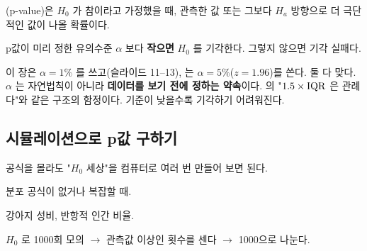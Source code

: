 \begin{definition}[p값]
\label{def:pvalue}
(p-value)은 $H_0$ 가 참이라고 가정했을 때, 관측한 값 또는 그보다
$H_a$ 방향으로 더 극단적인 값이 나올 확률이다.
\end{definition}

p값이 미리 정한 유의수준 $\alpha$ 보다 \textbf{작으면} $H_0$ 를 기각한다.
그렇지 않으면 기각 실패다.

\begin{pitfall}
\label{pit:ht-alpha}
이 장은 $\alpha = 1\%$ 를 쓰고(슬라이드 11--13), 는
$\alpha = 5\%$($z = 1.96$)를 쓴다. 둘 다 맞다. $\alpha$ 는 자연법칙이 아니라
\textbf{데이터를 보기 전에 정하는 약속}이다. 의
"$1.5 \times \mathrm{IQR}$ 은 관례다"와 같은 구조의 함정이다. 기준이 낮을수록
기각하기 어려워진다.
\end{pitfall}

\subsection{시뮬레이션으로 p값 구하기}
\label{sec:ht-simulation}

\begin{inbrief}
  \item[Why] 공식을 몰라도 "$H_0$ 세상"을 컴퓨터로 여러 번 만들어 보면 된다.
  \item[When] 분포 공식이 없거나 복잡할 때.
  \item[Where] 강아지 성비, 반항적 인간 비율.
  \item[How] $H_0$ 로 1000회 모의 $\to$ 관측값 이상인 횟수를 센다 $\to$
             1000으로 나눈다.
\end{inbrief}

